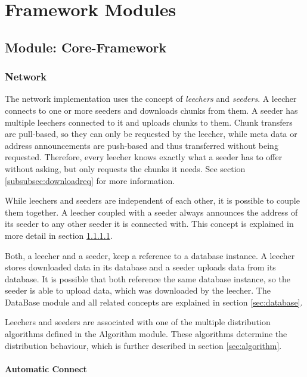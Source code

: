 \chapter{Framework Modules}
\label{ch:framework}



\section{Module: Core-Framework}
\label{sec:core}


\subsection{Network}
The network implementation uses the concept of \emph{leechers} and \emph{seeders}. A leecher connects to one or more seeders and downloads chunks from them. A seeder has multiple leechers connected to it and uploads chunks to them. Chunk transfers are pull-based, so they can only be requested by the leecher, while meta data or address announcements are push-based and thus transferred without being requested. Therefore, every leecher knows exactly what a seeder has to offer without asking, but only requests the chunks it needs. See section \ref{subsubsec:downloadreq} for more information.

While leechers and seeders are independent of each other, it is possible to couple them together. A leecher coupled with a seeder always announces the address of its seeder to any other seeder it is connected with. This concept is explained in more detail in section \ref{subsubsec:autoconnect}.

Both, a leecher and a seeder, keep a reference to a database instance. A leecher stores downloaded data in its database and a seeder uploads data from its database. It is possible that both reference the same database instance, so the seeder is able to upload data, which was downloaded by the leecher. The DataBase module and all related concepts are explained in section \ref{sec:database}.

Leechers and seeders are associated with one of the multiple distribution algorithms defined in the Algorithm module. These algorithms determine the distribution behaviour, which is further described in section \ref{sec:algorithm}.


\subsubsection{Automatic Connect}
\label{subsubsec:autoconnect}

